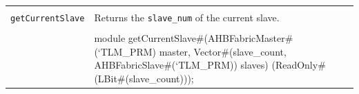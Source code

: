 \documentclass[twoside,letterpaper]{article}
\newcommand{\te}[1]{\texttt{#1}}
\newenvironment{libverbatim}
  {\vspace*{-1.0em}
   \verbatim}
  {\endverbatim
  }
\begin{document}


\begin{center}
\begin{tabular}{|p{1.2 in}|p{5 in}|}
\hline 
&\\
\te{getCurrentSlave}&  Returns the \te{slave\_num} of the current slave.\\
&\\
\cline{2-2}
&\begin{libverbatim}
module getCurrentSlave#(AHBFabricMaster#(`TLM_PRM) master, 
			Vector#(slave_count,
                        AHBFabricSlave#(`TLM_PRM)) slaves)  
                       (ReadOnly#(LBit#(slave_count)));
\end{libverbatim}
\\
\hline
\end{tabular}
\end{center}
\end{document}
